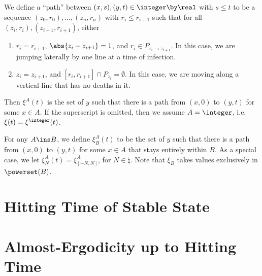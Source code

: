 \documentclass{scrartcl}
\begin{document}
We define a ``path'' between $(x,s), (y,t) \in \integer \by \real$ with $s \leq t$ to be a sequence
$(z_{0},r_{0}), \ldots, (z_{n},r_{n})$ with $r_{i} \leq r_{i+1}$ such that for all $(z_{i},r_{i}),(z_{i+1},r_{i+1})$, either
\begin{enumerate}
  \item $r_{i} = r_{i+1}$, $\abs{z_{i} - z_{i+1}} = 1$, and $r_{i} \in P_{z_{i} \to z_{i+1}}$. In this case, we are jumping laterally by one line at a time of infection.
  \item $z_{i} = z_{i+1}$, and $[r_{i},r_{i+1}] \cap P_{z_{i}} = \emptyset$. In this case, we are moving along a vertical line that has no deaths in it.
\end{enumerate}

Then $\xi^{A}(t)$ is the set of $y$ such that there is a path from $(x,0)$ to $(y,t)$ for some $x \in A$. If the superscript is omitted, then we assume $A = \integer$, i.e. $\xi(t) = \xi^{\integer}(t)$.

For any $A \ins B$, we define $\xi_{B}^{A}(t)$ to be the set of $y$ such that there is a path from $(x,0)$ to $(y,t)$ for some $x \in A$ that stays entirely within $B$. As a special case, we let $\xi_{N}^{A}(t) = \xi_{[-N,N]}^{A}$, for $N \in \natural$. Note that $\xi_{B}$ takes values exclusively in $\powerset(B)$.

\section{Hitting Time of Stable State}

\section{Almost-Ergodicity up to Hitting Time}
\end{document}
